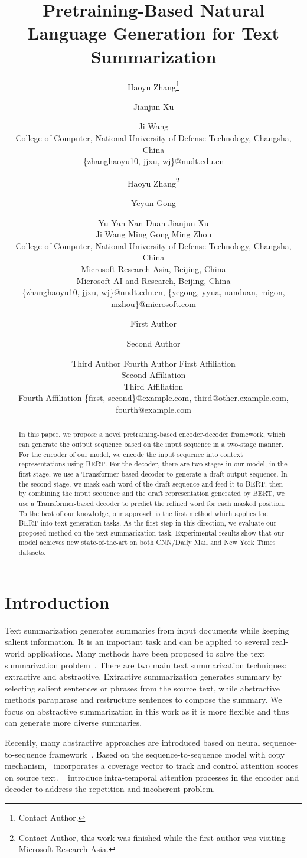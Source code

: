\documentclass{article}
\title{Pretraining-Based Natural Language Generation for Text Summarization}
\author{
Haoyu Zhang\footnote{Contact Author.}\and Jianjun Xu\and Ji Wang\\
\affiliations
College of Computer, National University of Defense Technology, Changsha, China\\
\emails
\{zhanghaoyu10, jjxu, wj\}@nudt.edu.cn
}
\author{
Haoyu Zhang\footnote{Contact Author, this work was finished while the first author was visiting Microsoft Research Asia.}\and
Yeyun Gong\and
Yu Yan\And
Nan Duan\And
Jianjun Xu\And \\
Ji Wang\And
Ming Gong\And
Ming Zhou\\
\affiliations
College of Computer, National University of Defense Technology, Changsha, China\\
Microsoft Research Asia, Beijing, China\\
Microsoft AI and Research, Beijing, China\\
\emails
\{zhanghaoyu10, jjxu, wj\}@nudt.edu.cn,
\{yegong, yyua, nanduan, migon, mzhou\}@microsoft.com
}
\author{
First Author
\and
Second Author\and
Third Author\And
Fourth Author
\affiliations
First Affiliation\\
Second Affiliation\\
Third Affiliation\\
Fourth Affiliation
\emails
\{first, second\}@example.com,
third@other.example.com,
fourth@example.com
}
\begin{document}
\maketitle

\begin{abstract}

In this paper, we propose a novel pretraining-based encoder-decoder framework, which can generate the output sequence based on the input sequence in a two-stage manner. For the encoder of our model, we encode the input sequence into context representations using BERT.
For the decoder, there are two stages in our model, in the first stage, we use a Transformer-based decoder to generate a draft output sequence.
In the second stage, we mask each word of the draft sequence and feed it to BERT, then by combining the input sequence and the draft representation generated by BERT, we use a Transformer-based decoder to predict the refined word for each masked position.
To the best of our knowledge, our approach is the first method which applies the BERT into text generation tasks.
As the first step in this direction, we evaluate our proposed method on the text summarization task. 
Experimental results show that our model achieves new state-of-the-art on both CNN/Daily Mail and New York Times datasets.

\end{abstract}

\section{Introduction} 
Text summarization generates summaries from input documents while keeping salient information. It is an important task and can be applied to several real-world applications. Many methods have been proposed to solve the text summarization problem~\cite{See2017,NallapatiZZ17,DBLP:conf/acl/ZhaoZWYHZ18,gehrmann2018bottom}. There are two main text summarization techniques: extractive and abstractive. 
Extractive summarization generates summary by selecting salient sentences or phrases from the source text, while abstractive methods paraphrase and restructure sentences to compose the summary. We focus on abstractive summarization in this work as it is more flexible and thus can generate more diverse summaries.

Recently, many abstractive approaches are introduced based on neural sequence-to-sequence framework~\cite{Paulus2018,See2017,gehrmann2018bottom,Li2018}. 
Based on the sequence-to-sequence model with copy mechanism,~\cite{See2017} incorporates a coverage vector to track and control attention scores on source text.
~\cite{Paulus2018} introduce intra-temporal attention processes in the encoder and decoder to address the repetition and incoherent problem.
\end{document}
